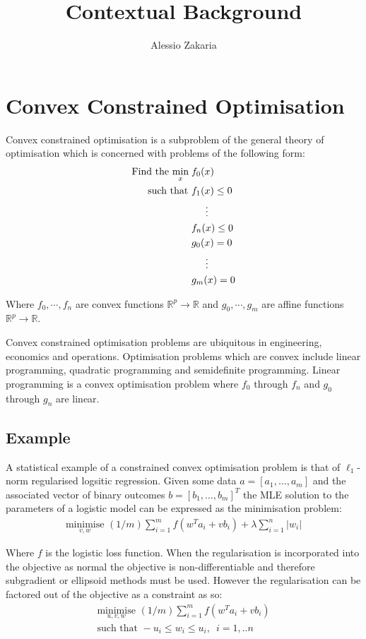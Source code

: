 \documentclass[a4paper,10pt]{article}
\date{}
\author{Alessio Zakaria}
\title{Contextual Background\vspace{-30mm}}
\def\rnum{\mathbb{R}}
\begin{document}
\maketitle
\section{Convex Constrained Optimisation}
Convex constrained optimisation is a subproblem of the general theory of
optimisation which is concerned with problems of the following form:
\begin{align*}
    \text{Find the }\underset{x}{\text{min}}\; &f_{0}(x) \\
    \text{  such that }&f_{1}(x) \leq 0 \\
    & \hspace{5mm} \vdots \\
    &f_{n}(x) \leq 0 \\
    &g_{0}(x) = 0 \\
    &\hspace{5mm} \vdots \\
    &g_{m}(x) = 0
\end{align*}

Where $f_0,\cdots, f_n$ are convex functions $\rnum^{p} \rightarrow \rnum$ and
$g_0, \cdots, g_m$ are affine functions $\rnum^{p} \rightarrow \rnum$.

Convex constrained optimisation problems are ubiquitous in engineering,
economics and operations. Optimisation problems which are convex include linear
programming, quadratic programming and semidefinite programming. Linear
programming is a convex optimisation problem where $f_{0}$ through $f_{n}$ and
$g_{0}$ through $g_{n}$ are linear.
\subsection{Example}
A statistical example of a
constrained convex optimisation problem is that of $\ell_{1}$-norm regularised
logsitic regression. Given some data $a = [a_{1},\dots,a_{m}]$ and the
associated vector of binary outcomes $b = [b_{1}, \dots, b_{m}]^{T}$ the MLE
solution to the parameters of a logistic model can be expressed as the
minimisation problem:
\begin{align*}
    \underset{v, w}{\text{minimise}} \,\, (1/m)\sum_{i=1}^{m}f(w^{T}a_{i} + vb_{i})
    + \lambda\sum_{i=1}^{n}|w_{i}|
\end{align*}

Where $f$ is the logistic loss function. When the regularisation is incorporated
into the objective as normal the objective is non-differentiable and therefore
subgradient or ellipsoid methods must be used. However the regularisation can be
factored out of the objective as a constraint as so:
\begin{align*}
    \underset{u, v, w}{\text{minimise}} \,\, (1/m)\sum_{i=1}^{m}f(w^{T}a_{i} +
    vb_{i}) \\
    \text{such that } -u_{i} \leq w_{i} \leq u_{i}, \,\,\, i=1,..n
\end{align*}
\end{document}
